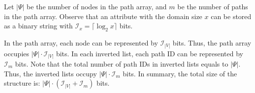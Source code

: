 \documentclass{sig-alternate}
\begin{document}
Let $|\Psi|$ be the number of nodes in the path array, and $m$ be the number of paths in the path array.
Observe that an attribute with the domain size $x$ can be stored
as a binary string with $\mathcal{I}_x= \lceil \log_2 x \rceil$ bits.

In the path array, each node can be represented by $\mathcal{I}_{|V|}$ bits.
Thus, the path array occupies $|\Psi| \cdot \mathcal{I}_{|V|}$ bits.
%
In each inverted list, each path ID can be represented by $\mathcal{I}_m$ bits.
Note that the total number of path IDs in inverted lists equals to $|\Psi|$.
Thus, the inverted lists occupy $|\Psi| \cdot \mathcal{I}_m$ bits.
%
In summary, the total size of the structure is: $|\Psi| \cdot (\mathcal{I}_{|V|}+\mathcal{I}_m)$ bits.








%











%
%
\end{document}
